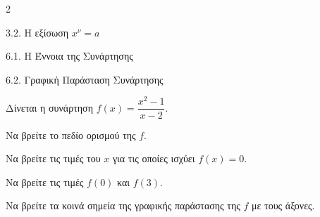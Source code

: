 \begin{ylh}{2}
    \item 3.2. Η εξίσωση $x^{\nu}=a$
    \item 6.1. Η Έννοια της Συνάρτησης
    \item 6.2. Γραφική Παράσταση Συνάρτησης
\end{ylh}
Δίνεται η συνάρτηση $f(x) = \dfrac{x^2 - 1}{x - 2}$.

\begin{alist}
\item Να βρείτε το πεδίο ορισμού της $f$.
\item

\begin{rlist}
\item Να βρείτε τις τιμές του $x$ για τις οποίες ισχύει $f(x) = 0$.
\item Να βρείτε τις τιμές $f(0)$ και $f(3)$.
\end{rlist}
\item Να βρείτε τα κοινά σημεία της γραφικής παράστασης της $f$ με τους άξονες.
\end{alist}

